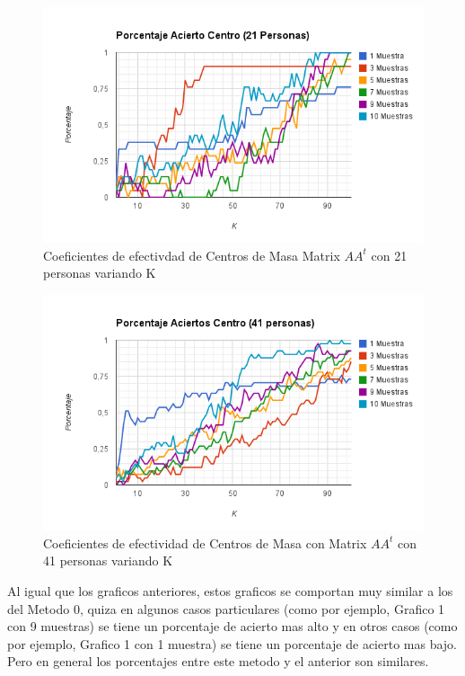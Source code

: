\begin{figure}[H] \includegraphics[width=1\textwidth]{img/imagen.png} \caption{Coeficientes de
    efectivdad de Centros de Masa Matrix $AA^t$ con 21 personas variando K} \end{figure}

\begin{figure}[H] \includegraphics[width=1\textwidth]{img/imager.png} \caption{Coeficientes de
    efectividad de Centros de Masa con Matrix $AA^t$ con 41 personas variando K} \end{figure}

Al igual que los graficos anteriores, estos graficos se comportan muy similar a los del Metodo 0,
quiza en algunos casos particulares (como por ejemplo, Grafico 1 con 9 muestras) se tiene un
porcentaje de acierto mas alto y en otros casos (como por ejemplo, Grafico 1 con 1 muestra) se tiene
un porcentaje de acierto mas bajo. Pero en general los porcentajes entre este metodo y el anterior
son similares.



